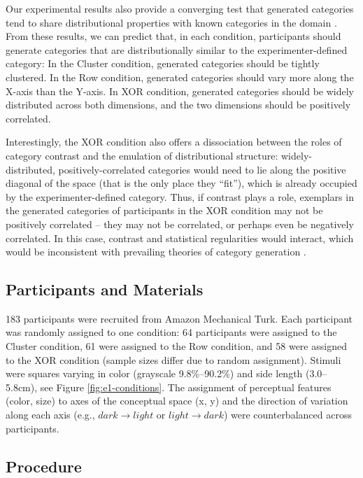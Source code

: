 \documentclass[12pt]{article}
\begin{document}
\begin{flushleft}
Our experimental results also provide a converging test
that generated categories tend to share distributional properties with known
categories in the domain \citep{jern2013probabilistic,ward1994structured}. From
these results, we can predict that, in each condition, participants should
generate categories that are distributionally similar to the
experimenter-defined category: In the Cluster condition, generated categories
should be tightly clustered. In the Row condition, generated categories should
vary more along the X-axis than the Y-axis. In XOR condition, generated
categories should be widely distributed across both dimensions, and the two
dimensions should be positively correlated.

Interestingly, the XOR condition also offers a dissociation between the roles of
category contrast and the emulation of distributional structure:
widely-distributed, positively-correlated categories would need to lie along the
positive diagonal of the space (that is the only place they ``fit''), which is
already occupied by the experimenter-defined category. Thus, if contrast plays a
role, exemplars in the generated categories of participants in the XOR condition
may not be positively correlated -- they may not be correlated, or perhaps even be negatively correlated.
In this case, contrast and statistical regularities would interact, which would
be inconsistent with prevailing theories of category generation
\citep{jern2013probabilistic}.


\subsection{Participants and Materials}

183 participants were recruited from Amazon Mechanical Turk. Each participant
was randomly assigned to one condition: 64 participants were assigned to the
Cluster condition, 61 were assigned to the Row condition, and 58 were assigned
to the XOR condition (sample sizes differ due to random assignment). Stimuli
were squares varying in color (grayscale 9.8\%--90.2\%) and side length
(3.0--5.8cm), see Figure \ref{fig:e1-conditions}. The assignment of perceptual
features (color, size) to axes of the conceptual space (x, y)  and the
direction of variation along each axis (e.g., $dark \rightarrow light$ or $light
\rightarrow dark$) were counterbalanced across participants.

\subsection{Procedure}


\end{flushleft}
\end{document}
